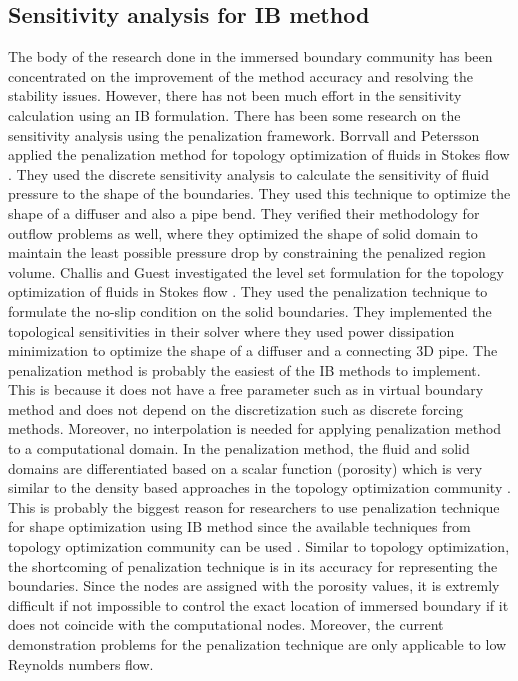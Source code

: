 \subsection{Sensitivity analysis for IB method}
The body of the research done in the immersed boundary community has been concentrated on the improvement of the method accuracy and resolving the stability issues. However, there has not been much effort in the sensitivity calculation using an IB formulation. There has been some research on the sensitivity analysis using the penalization framework. Borrvall and Petersson applied the penalization method for topology optimization of fluids in Stokes flow \cite{borrvall2003topology}. They used the discrete sensitivity analysis to calculate the sensitivity of fluid pressure to the shape of the boundaries. They used this technique to optimize the shape of a diffuser and also a pipe bend. They verified their methodology for outflow problems as well, where they optimized the shape of solid domain to maintain the least possible pressure drop by constraining the penalized region volume.  Challis and Guest investigated the level set formulation for the topology optimization of fluids in Stokes flow \cite{challis2009level}. They used the penalization technique to formulate the no-slip condition on the solid boundaries. They implemented the topological sensitivities in their solver where they used power dissipation minimization to optimize the shape of a diffuser and a connecting 3D pipe. The penalization method is probably the easiest of the IB methods to implement. This is because it does not have a free parameter such as in virtual boundary method and does not depend on the discretization such as discrete forcing methods. Moreover, no interpolation is needed for applying penalization method to a computational domain. In the penalization method, the fluid and solid domains are differentiated based on a scalar function (porosity) which is very similar to the density based approaches in the topology optimization community \cite{deaton2014survey}. This is probably the biggest reason for researchers to use penalization technique for shape optimization using IB method since the available techniques from topology optimization community can be used \cite{leveque1997immersed, pingen2007topology}. Similar to topology optimization, the shortcoming of penalization technique is in its accuracy for representing the boundaries. Since the nodes are assigned with the porosity values, it is extremly difficult if not impossible to control the exact location of immersed boundary if it does not coincide with the computational nodes. Moreover, the current demonstration problems for the penalization technique are only applicable to low Reynolds numbers flow.

